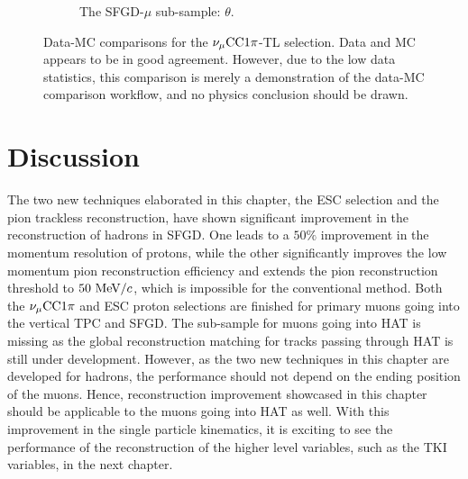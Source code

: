 \begin{figure}[h]
\begin{subfigure}{\dbfigwid\textwidth}
                    \caption{The SFGD-$\mu$ sub-sample: $\theta$.}
                    \label{subfig:datamc-theta-sfgmu}
               \end{subfigure}
               \caption{Data-MC comparisons for the $\nu_{\mu}\textrm{CC}1\pi$-TL selection. Data and MC appears to be in good agreement. However, due to the low data statistics, this comparison is merely a demonstration of the data-MC comparison workflow, and no physics conclusion should be drawn.}
               \label{fig:tlpi-datamc}
          \end{figure}

     \section{Discussion}
     \label{sec:technique-disc}
          The two new techniques elaborated in this chapter, the ESC selection and the pion trackless reconstruction, have shown significant improvement in the reconstruction of hadrons in SFGD.
          One leads to a $50\%$ improvement in the momentum resolution of protons, while the other significantly improves the low momentum pion reconstruction efficiency and extends the pion reconstruction threshold to $50~\textrm{MeV}/c$, which is impossible for the conventional method.
          Both the $\nu_{\mu}\textrm{CC}1\pi$ and ESC proton selections are finished for primary muons going into the vertical TPC and SFGD. 
          The sub-sample for muons going into HAT is missing as the global reconstruction matching for tracks passing through HAT is still under development.
          However, as the two new techniques in this chapter are developed for hadrons, the performance should not depend on the ending position of the muons.
          Hence, reconstruction improvement showcased in this chapter should be applicable to the muons going into HAT as well.
          With this improvement in the single particle kinematics, it is exciting to see the performance of the reconstruction of the higher level variables, such as the TKI variables, in the next chapter.